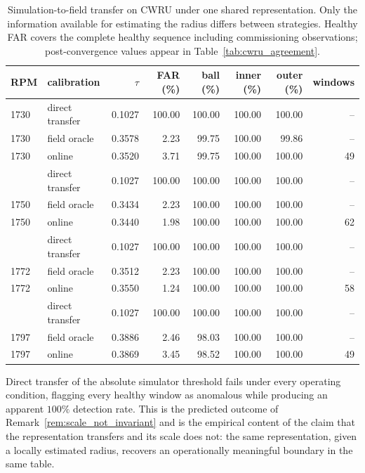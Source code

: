 \documentclass[a4paper]{cas-sc}
\begin{document}
\begin{table}[!ht]
\centering
\caption{Simulation-to-field transfer on CWRU under one shared
representation. Only the information available for estimating the radius
differs between strategies. Healthy FAR covers the complete healthy sequence
including commissioning observations; post-convergence values appear in
Table~\ref{tab:cwru_agreement}.}
\label{tab:cwru_transfer}
\setlength{\tabcolsep}{4pt}
\begin{tabular}{llrrrrrr}
\toprule
RPM & calibration & \(\tau\) & FAR (\%) & ball (\%) & inner (\%) & outer (\%) & windows \\
\midrule
1730 & direct transfer & 0.1027 & 100.00 & 100.00 & 100.00 & 100.00 & -- \\
1730 & field oracle    & 0.3578 & 2.23   & 99.75  & 100.00 & 99.86  & -- \\
1730 & online          & 0.3520 & 3.71   & 99.75  & 100.00 & 100.00 & 49 \\
\addlinespace
1750 & direct transfer & 0.1027 & 100.00 & 100.00 & 100.00 & 100.00 & -- \\
1750 & field oracle    & 0.3434 & 2.23   & 100.00 & 100.00 & 100.00 & -- \\
1750 & online          & 0.3440 & 1.98   & 100.00 & 100.00 & 100.00 & 62 \\
\addlinespace
1772 & direct transfer & 0.1027 & 100.00 & 100.00 & 100.00 & 100.00 & -- \\
1772 & field oracle    & 0.3512 & 2.23   & 100.00 & 100.00 & 100.00 & -- \\
1772 & online          & 0.3550 & 1.24   & 100.00 & 100.00 & 100.00 & 58 \\
\addlinespace
1797 & direct transfer & 0.1027 & 100.00 & 100.00 & 100.00 & 100.00 & -- \\
1797 & field oracle    & 0.3886 & 2.46   & 98.03  & 100.00 & 100.00 & -- \\
1797 & online          & 0.3869 & 3.45   & 98.52  & 100.00 & 100.00 & 49 \\
\bottomrule
\end{tabular}
\end{table}

Direct transfer of the absolute simulator threshold fails under every
operating condition, flagging every healthy window as anomalous while
producing an apparent \(100\%\) detection rate. This is the predicted outcome
of Remark~\ref{rem:scale_not_invariant} and is the empirical content of the
claim that the representation transfers and its scale does not: the same
representation, given a locally estimated radius, recovers an operationally
meaningful boundary in the same table.
\end{document}
